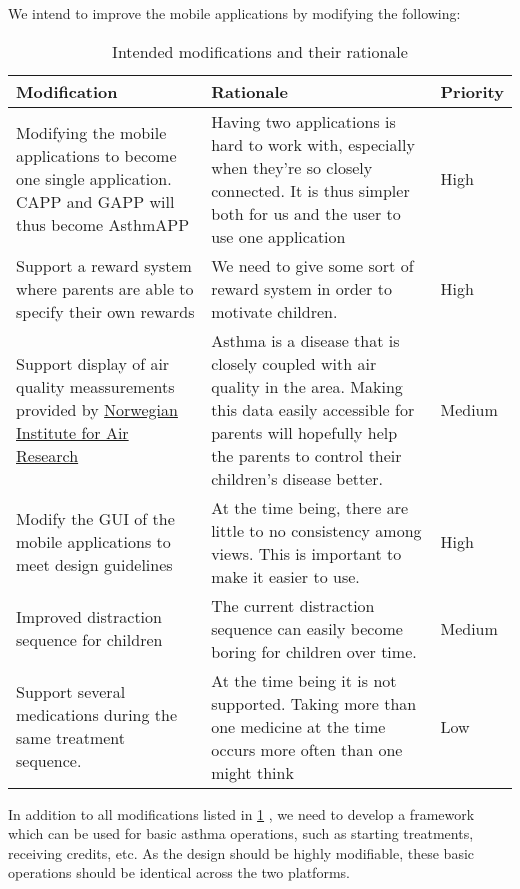 We intend to improve the mobile applications by modifying the following:
\begin{table}

\begin{tabular}{| p{5.0cm} | p{5.0cm} | p{3.0cm} |}
	\hline
	\textbf{Modification} & \textbf{Rationale} & \textbf{Priority} \\
	\hline
	Modifying the mobile applications to become one single application. CAPP and GAPP will thus become AsthmAPP 
	&
	Having two applications is hard to work with, especially when they're so closely connected. It is thus simpler both for us and the user to use one application
	&
	High
	\\ \hline
	Support a reward system where parents are able to specify their own rewards
	&
	We need to give some sort of reward system in order to motivate children.
	&
	High 
	\\ \hline
	Support display of air quality meassurements provided by \href{http://luftkvalitet.info}{Norwegian Institute for Air Research}
	&
	Asthma is a disease that is closely coupled with air quality in the area. Making this data easily accessible for parents will hopefully help the parents to control their children's disease better.
	&
	Medium  
	\\ \hline
	Modify the GUI of the mobile applications to meet design guidelines
	&
	At the time being, there are little to no consistency among views. This is important to make it easier to use.
	&
	High 
	\\ \hline
	Improved distraction sequence for children
	& 
	The current distraction sequence can easily become boring for children over time.
	&
	Medium
	\\ \hline
	Support several medications during the same treatment sequence.
	&
	At the time being it is not supported. Taking more than one medicine at the time occurs more often than one might think
	&
	Low 
	\\ \hline
\end{tabular}
\caption{Intended modifications and their rationale}
\label{tab:intended-modifications}
\end{table}

In addition to all modifications listed in \ref{tab:intended-modifications} , we need to develop a framework which can be used for basic asthma operations, such as starting treatments, receiving credits, etc. As the design should be highly modifiable, these basic operations should be identical across the two platforms.    
 